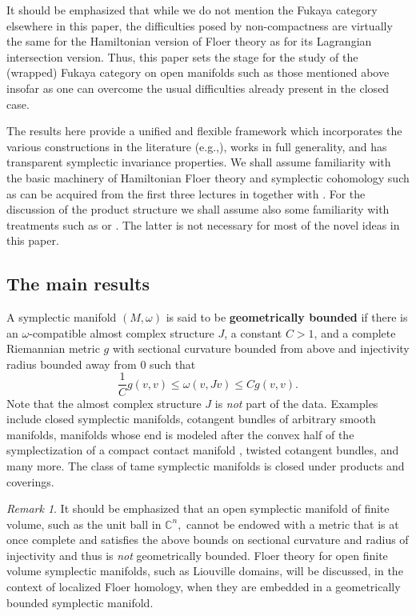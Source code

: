 \documentclass[11pt]{amsart}
\newcommand{\C}{\mathbb{C}}
\theoremstyle{definition}
\theoremstyle{remark}
\newtheorem{rem}[tm]{Remark}
\begin{document}
It should be emphasized that while we do not mention the Fukaya category elsewhere in this paper, the difficulties posed by  non-compactness are virtually the same for the Hamiltonian version of Floer theory as for its Lagrangian intersection version. Thus, this paper sets the stage for the study of the (wrapped) Fukaya category on open manifolds such as those mentioned above insofar as one can overcome the usual difficulties already present in the closed case.

The results here provide a unified and flexible framework which incorporates the various constructions in the literature (e.g.,\cite{CielFloerHofer,Viterbo99,Oancea06,Ritter10}), works in full generality, and has transparent symplectic invariance properties. We shall assume familiarity with the basic machinery of Hamiltonian Floer theory and symplectic cohomology such as can be acquired from the first three lectures in \cite{Salamon1999} together with \cite{Oancea04}. For the discussion of the product structure we shall assume also some familiarity with treatments such as \cite{Abouzaid2013} or \cite{Ritter13}. The latter is not necessary for most of the novel ideas in this paper.
\subsection{The main results}
A symplectic manifold $(M,\omega)$ is said to be \textbf{geometrically bounded} if there is an $\omega$-compatible almost complex structure $J$, a constant $C>1$, and  a complete Riemannian metric $g$ with sectional curvature bounded from above and injectivity radius bounded away from $0$ such that
\[
\frac1{C}g(v,v)\leq \omega(v,Jv)\leq Cg(v,v).
\]
Note that the almost complex structure $J$ is \textit{not} part of the data.
Examples include closed symplectic manifolds, cotangent bundles of arbitrary smooth manifolds, manifolds whose end is modeled after the convex half of the symplectization of a compact contact manifold \cite{Sikorav94}, twisted cotangent bundles\cite{CielGinzKer}, and many more. The class of tame symplectic manifolds is closed under products and coverings.

\begin{rem}It should be emphasized that an open symplectic manifold of finite volume, such as the unit ball in $\C^n,$ cannot be endowed with a metric that is at once complete and satisfies the above bounds on sectional curvature and radius of injectivity and thus is \textit{not} geometrically bounded. Floer theory for open finite volume symplectic manifolds, such as Liouville domains, will be discussed, in the context of localized Floer homology, when they are embedded in a geometrically bounded symplectic manifold.
\end{rem}
\end{document}
